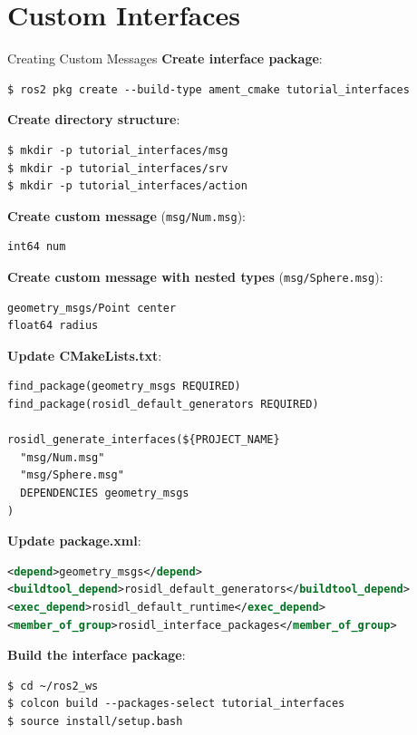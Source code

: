 \section{Custom Interfaces}

\begin{frame}{Creating Custom Messages}
    \textbf{Create interface package}:
    \begin{lstlisting}[language=shell]
$ ros2 pkg create --build-type ament_cmake tutorial_interfaces
\end{lstlisting}

    \textbf{Create directory structure}:
    \begin{lstlisting}[language=shell]
$ mkdir -p tutorial_interfaces/msg
$ mkdir -p tutorial_interfaces/srv
$ mkdir -p tutorial_interfaces/action
\end{lstlisting}

    \textbf{Create custom message} (\texttt{msg/Num.msg}):
    \begin{lstlisting}[language=syntax]
int64 num
\end{lstlisting}

    \textbf{Create custom message with nested types} (\texttt{msg/Sphere.msg}):
    \begin{lstlisting}[language=syntax]
geometry_msgs/Point center
float64 radius
\end{lstlisting}

    \framebreak

    \textbf{Update CMakeLists.txt}:
    \begin{lstlisting}[language=syntax]
find_package(geometry_msgs REQUIRED)
find_package(rosidl_default_generators REQUIRED)

rosidl_generate_interfaces(${PROJECT_NAME}
  "msg/Num.msg"
  "msg/Sphere.msg"
  DEPENDENCIES geometry_msgs
)
\end{lstlisting}

    \textbf{Update package.xml}:
    \begin{lstlisting}[language=xml]
<depend>geometry_msgs</depend>
<buildtool_depend>rosidl_default_generators</buildtool_depend>
<exec_depend>rosidl_default_runtime</exec_depend>
<member_of_group>rosidl_interface_packages</member_of_group>
\end{lstlisting}

    \framebreak

    \textbf{Build the interface package}:
    \begin{lstlisting}[language=shell]
$ cd ~/ros2_ws
$ colcon build --packages-select tutorial_interfaces
$ source install/setup.bash
\end{lstlisting}


\end{frame}
